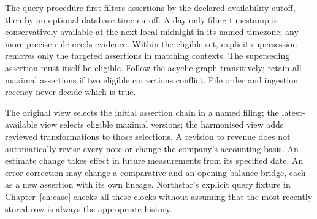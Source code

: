 The query procedure first filters assertions by the declared availability
cutoff, then by an optional database-time cutoff. A day-only filing timestamp
is conservatively available at the next local midnight in its named timezone;
any more precise rule needs evidence. Within the eligible set, explicit
supersession removes only the targeted assertions in matching contexts.
The superseding assertion must itself be eligible. Follow the acyclic graph
transitively; retain all maximal assertions if two eligible corrections
conflict. File order and ingestion recency never decide which is true.

The original view selects the initial assertion chain in a named filing;
the latest-available view selects eligible maximal versions; the harmonised
view adds reviewed transformations to those selections. A revision to revenue
does not automatically revise every note or change the company's accounting
basis. An estimate change takes effect in future measurements from its
specified date. An error correction may change a comparative and an opening
balance bridge, each as a new assertion with its own lineage. Northstar's
explicit query fixture in Chapter~\ref{ch:case} checks all these clocks without
assuming that the most recently stored row is always the appropriate history.
